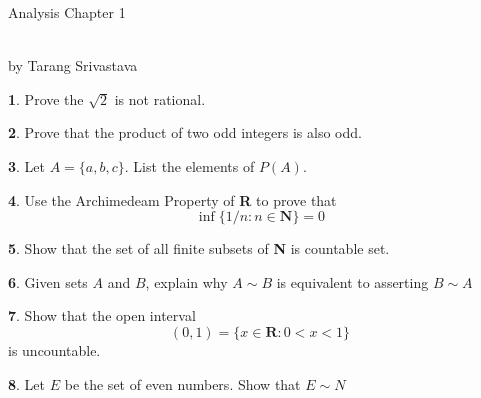 \documentclass[10pt, twocolumn]{article}
\author{Tarang Srivastava}
\newcommand{\makechaptertitle}[1]{
\begin{center}
	\begin{large}
		#1
	\end{large}
	\begin{small}
		\\by Tarang Srivastava
	\end{small}
\end{center}
}
\theoremstyle{definition}
\newtheorem{q}{}
\begin{document}
		\makechaptertitle{Analysis Chapter 1}
		\begin{q}
			Prove the $ \sqrt{2}$ is not rational.
		\end{q}
		\begin{q}
			Prove that the product of two odd integers is also odd.
		\end{q}
		\begin{q}
			Let $ A = \{ a , b , c \} $. List the elements of $ P(A) $.
		\end{q}
		\begin{q}
			Use the Archimedeam Property of \textbf{R} to prove that
			\[ \inf \{ 1 / n : n \in \mathbf { N } \} = 0 \]
 		\end{q}
 		\begin{q}
 			Show that the set of all finite subsets of \textbf{N} is countable set.
  		\end{q}
		\begin{q}
			Given sets $ A $ and $ B $, explain why $ A \sim B $ is equivalent to asserting $ B \sim A $
		\end{q}
		\begin{q}
			Show that the open interval 
			\[ ( 0,1 ) = \{ x \in \mathbf { R } : 0 < x < 1 \} \]
			is uncountable.
		\end{q} 
		\begin{q}
			Let $ E $ be the set of even numbers. Show that $ E \sim N $
		\end{q}
\end{document}
